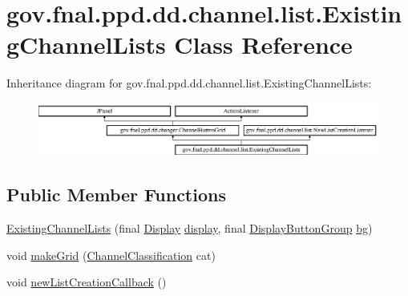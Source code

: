 \hypertarget{classgov_1_1fnal_1_1ppd_1_1dd_1_1channel_1_1list_1_1ExistingChannelLists}{\section{gov.\-fnal.\-ppd.\-dd.\-channel.\-list.\-Existing\-Channel\-Lists Class Reference}
\label{classgov_1_1fnal_1_1ppd_1_1dd_1_1channel_1_1list_1_1ExistingChannelLists}
}
Inheritance diagram for gov.\-fnal.\-ppd.\-dd.\-channel.\-list.\-Existing\-Channel\-Lists\-:\begin{figure}[H]
\begin{center}
\leavevmode
\includegraphics[height=1.761006cm]{classgov_1_1fnal_1_1ppd_1_1dd_1_1channel_1_1list_1_1ExistingChannelLists}
\end{center}
\end{figure}
\subsection*{Public Member Functions}
\begin{DoxyCompactItemize}
\item 
\hyperlink{classgov_1_1fnal_1_1ppd_1_1dd_1_1channel_1_1list_1_1ExistingChannelLists_a70f446df6a0fcf3cea1e0d524aea2192}{Existing\-Channel\-Lists} (final \hyperlink{interfacegov_1_1fnal_1_1ppd_1_1dd_1_1signage_1_1Display}{Display} \hyperlink{classgov_1_1fnal_1_1ppd_1_1dd_1_1changer_1_1ChannelButtonGrid_a3c06b51489dcaacd16f6efcefe06bcaa}{display}, final \hyperlink{classgov_1_1fnal_1_1ppd_1_1dd_1_1util_1_1DisplayButtonGroup}{Display\-Button\-Group} \hyperlink{classgov_1_1fnal_1_1ppd_1_1dd_1_1changer_1_1ChannelButtonGrid_adf258a89161282e5215b4642ecbec812}{bg})
\item 
void \hyperlink{classgov_1_1fnal_1_1ppd_1_1dd_1_1channel_1_1list_1_1ExistingChannelLists_affca544ad4b4775e0b36334e75595c77}{make\-Grid} (\hyperlink{classgov_1_1fnal_1_1ppd_1_1dd_1_1changer_1_1ChannelClassification}{Channel\-Classification} cat)
\item 
void \hyperlink{classgov_1_1fnal_1_1ppd_1_1dd_1_1channel_1_1list_1_1ExistingChannelLists_a1cedfe917a325659dfa082f83c9cef96}{new\-List\-Creation\-Callback} ()
\end{DoxyCompactItemize}
